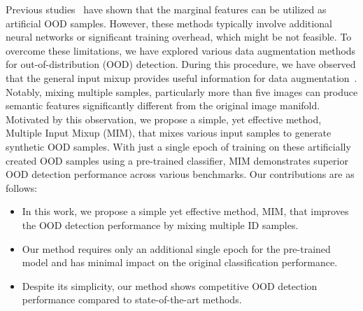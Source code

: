 \documentclass[letterpaper]{article} %
\begin{document}
Previous studies~\cite{kirby,gan} have shown that the marginal features can be utilized as artificial OOD samples.
However, these methods typically involve additional neural networks or significant training overhead, which might be not feasible.
To overcome these limitations, we have explored various data augmentation methods for out-of-distribution (OOD) detection.
During this procedure, we have observed that the general input mixup provides useful information for data augmentation~\cite{mixup}. Notably, mixing multiple samples, particularly more than five images can produce semantic features significantly different from the original image manifold.
Motivated by this observation, we propose a simple, yet effective method, Multiple Input Mixup (MIM), that mixes various input samples to generate synthetic OOD samples.
With just a single epoch of training on these artificially created OOD samples using a pre-trained classifier, MIM demonstrates superior OOD detection performance across various benchmarks.
Our contributions are as follows:
\vspace{-0.1cm}
\begin{itemize}
    \item In this work, we propose a simple yet effective method, MIM, that improves the OOD detection performance by mixing multiple ID samples.
    \item Our method requires only an additional single epoch for the pre-trained model and has minimal impact on the original classification performance.
    \item Despite its simplicity, our method shows competitive OOD detection performance compared to state-of-the-art methods.
\end{itemize}
\vspace{-0.3cm}
\end{document}
